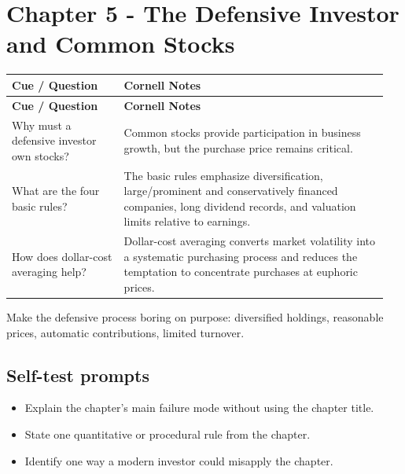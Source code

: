 \documentclass[11pt]{article}
\begin{document}
\section{Chapter 5 - The Defensive Investor and Common Stocks}
\begin{longtable}{@{}>{\raggedright\arraybackslash}p{0.29\linewidth}>{\raggedright\arraybackslash}p{0.66\linewidth}@{}}\toprule\textbf{Cue / Question} & \textbf{Cornell Notes}\\\midrule\endfirsthead\toprule\textbf{Cue / Question} & \textbf{Cornell Notes}\\\midrule\endhead
Why must a defensive investor own stocks? & Common stocks provide participation in business growth, but the purchase price remains critical. \\
What are the four basic rules? & The basic rules emphasize diversification, large/prominent and conservatively financed companies, long dividend records, and valuation limits relative to earnings. \\
How does dollar-cost averaging help? & Dollar-cost averaging converts market volatility into a systematic purchasing process and reduces the temptation to concentrate purchases at euphoric prices. \\
\bottomrule\end{longtable}
\begin{principlebox}Make the defensive process boring on purpose: diversified holdings, reasonable prices, automatic contributions, limited turnover.\end{principlebox}
\subsection*{Self-test prompts}\begin{itemize}\item Explain the chapter's main failure mode without using the chapter title.\item State one quantitative or procedural rule from the chapter.\item Identify one way a modern investor could misapply the chapter.\end{itemize}
\end{document}

